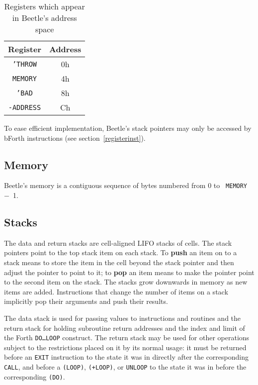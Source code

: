 \documentclass{article}
\begin{document}
\begin{table}[htbp]
\begin{center}
\begin{tabular}{|c|c|} \hline
\rule[-2mm]{0mm}{6mm}\bf Register & \bf Address \\ \hline
{\tt 'THROW} & 0h \\
{\tt MEMORY} & 4h \\
{\tt 'BAD} & 8h \\
{\tt -ADDRESS} & Ch \\ \hline
\end{tabular}
\end{center}
\vspace{-2mm}
\caption{\label{mappedtable}Registers which appear in Beetle's address
    space}
\end{table}

To ease efficient implementation, Beetle's stack pointers may only be accessed
by bForth instructions (see section~\ref{registerinst}).


\subsection{Memory}

Beetle's memory is a contiguous sequence of bytes numbered from 0 to {\tt
MEMORY}~$-$~1.


\subsection{Stacks}

The data and return stacks are cell-aligned LIFO stacks of cells. The stack
pointers point to the top stack item on each stack. To {\bf push} an item on to
a stack means to store the item in the cell beyond the stack pointer and then
adjust the pointer to point to it; to {\bf pop} an item means to make the
pointer point to the second item on the stack. The stacks grow downwards in
memory as new items are added. Instructions that change the number of items on a
stack implicitly pop their arguments and push their results.

The data stack is used for passing values to instructions and routines and the
return stack for holding subroutine return addresses and the index and limit of
the Forth {\tt DO\dots LOOP} construct. The return stack may be used for other
operations subject to the restrictions placed on it by its normal usage: it must
be returned before an {\tt EXIT} instruction to the state it was in directly
after the corresponding {\tt CALL}, and before a {\tt (LOOP)}, {\tt (+LOOP)}, or
{\tt UNLOOP} to the state it was in before the corresponding {\tt (DO)}.
\end{document}
